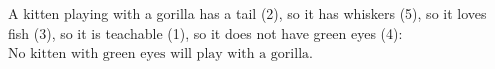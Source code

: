A kitten playing with a gorilla has a tail (2), so it has whiskers (5), so it loves fish (3), so it is teachable (1), so it does not have green eyes (4): $\boxed{\text{No kitten with green eyes will play with a gorilla.}}$

